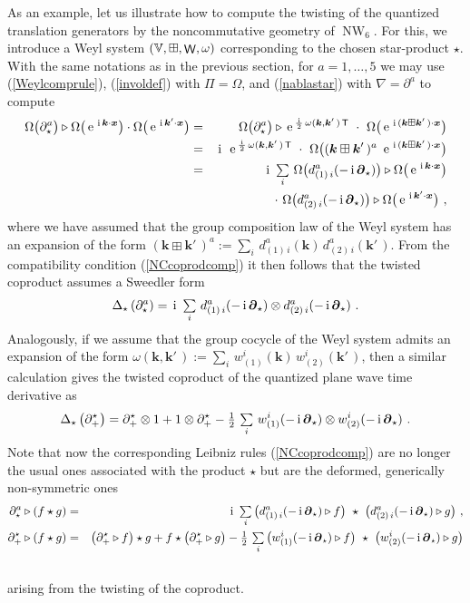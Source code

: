 \documentclass[11pt,a4paper]{article}
\DeclareMathOperator{\NW}{NW}
\DeclareMathOperator{\weyl}{{\sf W}}                   %
\newcommand{\comp}{\boxplus}                            %
\newcommand{\mbf}[1]{{\boldsymbol {#1} }}
\def\ii{{\,{\rm i}\,}}
\def\T{{\sf T}}
\def\mx{{\mbf x}}
\def\mk{{\mbf k}}
\def\mdell{{\mbf\partial}}
\def\mbbV{{\mathbb V}}
\def\e{{\,\rm e}\,}
\def\bea{\begin{eqnarray}}
\def\eea{\end{eqnarray}}
\newcommand{\beq}{\begin{eqnarray}}
\newcommand{\eeq}{\end{eqnarray}}
\begin{document}
As an example, let us illustrate how to compute the twisting of the
quantized translation generators by the noncommutative geometry of $\NW_6$. For
this, we introduce a Weyl system $(\mbbV,\comp,\weyl,\omega)$
corresponding to the chosen star-product $\star$. With the same
notations as in the previous section, for $a=1,\dots,5$ we may use
(\ref{Weylcomprule}), (\ref{involdef}) with $\Pi=\Omega$, and
(\ref{nablastar}) with $\nabla=\partial^a$ to compute
\bea
\Omega\bigl(\partial_\star^a\bigr)\triangleright\Omega\bigl(
\e^{\ii\mk\cdot\mx}\bigr)\cdot\Omega\bigl(\e^{\ii\mk'\cdot\mx}
\bigr)&=&\Omega\bigl(\partial_\star^a\bigr)\triangleright
\e^{\frac\ii2\,\omega(\mk,\mk'\,)\,\T}~\cdot~\Omega\bigl(
\e^{\ii(\mk\comp\mk'\,)\cdot\mx}\bigr) \nonumber\\ &=&
\ii~\e^{\frac\ii2\,\omega(\mk,\mk'\,)\,\T}~\cdot~\Omega
\bigl((\mk\comp\mk'\,)^a~\e^{\ii(\mk\comp\mk'\,)\cdot\mx}\bigr)
\nonumber\\ &=& \ii~\mbox{$\sum\limits_i$}~\Omega\bigl(d^a_{(1)\,i}(
-\ii\mdell_\star)\bigr)\triangleright\Omega\bigl(\e^{\ii\mk\cdot\mx}
\bigr)\nonumber\\ && \qquad\qquad
\cdot~\Omega\bigl(d^a_{(2)\,i}(-\ii\mdell_\star)\bigr)
\triangleright\Omega\bigl(\e^{\ii\mk'\cdot\mx}\bigr) \ ,
\label{partialstarderiv}\eea
where we have assumed that the group composition law of the Weyl
system has an expansion of the form
$(\mk\comp\mk'\,)^a:=\sum_i\,d^a_{(1)\,i}(\mk)\,d^a_{(2)\,i}(\mk'\,)$. From
the compatibility condition (\ref{NCcoprodcomp}) it then follows that
the twisted coproduct assumes a Sweedler form
\beq
\Delta_\star\left(\partial_\star^a\right)=\ii~
\mbox{$\sum\limits_i$}~d^a_{(1)\,i}(-\ii\mdell_\star)\otimes
d^a_{(2)\,i}(-\ii\mdell_\star) \ .
\label{Deltastarexpl}\eeq
Analogously, if we assume that the group cocycle of the Weyl system
admits an expansion of the form
$\omega(\mk,\mk'\,):=\sum_i\,w^i_{(1)}(\mk)\,w^i_{(2)}(\mk'\,)$, then
a similar calculation gives the twisted coproduct of the quantized
plane wave time derivative as
\beq
\Delta_\star\left(\partial_+^\star\right)=\partial_+^\star
\otimes1+1\otimes\partial_+^\star-\mbox{$\frac12\,\sum\limits_i$}~
w^i_{(1)}(-\ii\mdell_\star)\otimes w^i_{(2)}(-\ii\mdell_\star) \ .
\label{Deltastartime}\eeq
Note that now the corresponding Leibniz rules (\ref{NCcoprodcomp}) are
no longer the usual ones associated with the product $\star$ but are
the deformed, generically non-symmetric ones
\bea
\partial^a_\star\triangleright(f\star g)&=&\ii~\mbox{$\sum\limits_i$}\,
\bigl(d^a_{(1)\,i}(-\ii\mdell_\star)\triangleright f\bigr)~\star~\bigl(
d^a_{(2)\,i}(-\ii\mdell_\star)\triangleright g\bigr) \ , \nonumber\\
\partial_+^\star\triangleright(f\star g)&=&\left(\partial_+^\star
\triangleright f\right)\star g+f\star\left(\partial_+^\star
\triangleright g\right)-\mbox{$\frac12\,\sum\limits_i$}\,
\bigl(w^i_{(1)}(-\ii\mdell_\star)\triangleright f\bigr)~\star~
\bigl(w^i_{(2)}(-\ii\mdell_\star)\triangleright g\bigr) \nonumber\\ &&
\label{defLeibniz}\eea
arising from the twisting of the coproduct.
\end{document}
